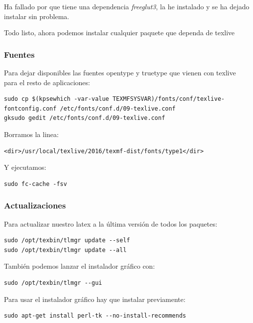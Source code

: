 \documentclass[12pt,spanish,]{scrartcl}
\begin{document}
Ha fallado por que tiene una dependencia \emph{freeglut3}, la he
instalado y se ha dejado instalar sin problema.

Todo listo, ahora podemos instalar cualquier paquete que dependa de
texlive

\hypertarget{fuentes}{%
\subsubsection{Fuentes}\label{fuentes}}

Para dejar disponibles las fuentes opentype y truetype que vienen con
texlive para el resto de aplicaciones:

\begin{verbatim}
sudo cp $(kpsewhich -var-value TEXMFSYSVAR)/fonts/conf/texlive-fontconfig.conf /etc/fonts/conf.d/09-texlive.conf
gksudo gedit /etc/fonts/conf.d/09-texlive.conf
\end{verbatim}

Borramos la linea:

\begin{verbatim}
<dir>/usr/local/texlive/2016/texmf-dist/fonts/type1</dir>
\end{verbatim}

Y ejecutamos:

\begin{verbatim}
sudo fc-cache -fsv
\end{verbatim}

\hypertarget{actualizaciones}{%
\subsubsection{Actualizaciones}\label{actualizaciones}}

Para actualizar nuestro latex a la última versión de todos los paquetes:

\begin{verbatim}
sudo /opt/texbin/tlmgr update --self
sudo /opt/texbin/tlmgr update --all
\end{verbatim}

También podemos lanzar el instalador gráfico con:

\begin{verbatim}
sudo /opt/texbin/tlmgr --gui
\end{verbatim}

Para usar el instalador gráfico hay que instalar previamente:

\begin{verbatim}
sudo apt-get install perl-tk --no-install-recommends
\end{verbatim}
\end{document}
